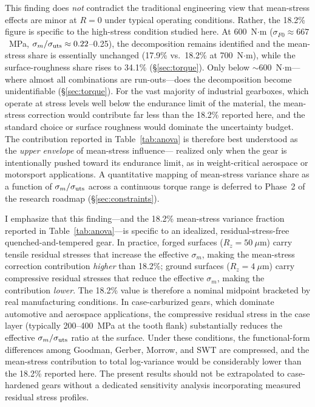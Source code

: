 \documentclass[twocolumn,12pt,a4paper]{article}
\begin{document}
This finding does \emph{not} contradict the traditional engineering
view that mean-stress effects are minor at $R=0$ under typical
operating conditions. Rather, the 18.2\% figure is specific to the
high-stress condition studied here. At 600~N$\cdot$m
($\sigma_{F0}\approx 667$~MPa, $\sigma_m/\sigma_{\rm uts}\approx
0.22$--0.25), the decomposition remains identified and the
mean-stress share is essentially unchanged (17.9\% vs.\ 18.2\% at
700~N$\cdot$m), while the surface-roughness share rises to 34.1\%
(\S\ref{sec:torque}). Only below $\sim$600~N$\cdot$m---where almost
all combinations are run-outs---does the decomposition become
unidentifiable (\S\ref{sec:torque}).
For the vast majority of industrial
gearboxes, which operate at stress levels well below the endurance
limit of the material, the mean-stress correction would contribute
far less than the 18.2\% reported here, and the standard choice or
surface roughness would dominate the uncertainty budget. The
contribution reported in Table~\ref{tab:anova} is therefore best
understood as the \emph{upper envelope} of mean-stress influence---
realized only when the gear is intentionally pushed toward its
endurance limit, as in weight-critical aerospace or motorsport
applications. A quantitative mapping of mean-stress variance share
as a function of $\sigma_m/\sigma_{\rm uts}$ across a continuous
torque range is deferred to Phase~2 of the research roadmap (\S\ref{sec:constraints}).

I emphasize that this finding---and the 18.2\% mean-stress variance
fraction reported in Table~\ref{tab:anova}---is specific to an
idealized, residual-stress-free quenched-and-tempered gear. In
practice, forged surfaces ($R_z=50~\mu$m) carry tensile residual
stresses that increase the effective $\sigma_m$, making the
mean-stress correction contribution \emph{higher} than 18.2\%;
ground surfaces ($R_z=4~\mu$m) carry compressive residual stresses
that reduce the effective $\sigma_m$, making the contribution
\emph{lower}. The 18.2\% value is therefore a nominal midpoint
bracketed by real manufacturing conditions. In
case-carburized gears, which dominate automotive and aerospace
applications, the compressive residual stress in the case layer
(typically 200--400~MPa at the tooth flank) substantially reduces the
effective $\sigma_m/\sigma_{\rm uts}$ ratio at the surface. Under these
conditions, the functional-form differences among Goodman, Gerber,
Morrow, and SWT are compressed, and the mean-stress contribution to
total log-variance would be considerably lower than the 18.2\% reported
here. The present results should not be extrapolated to case-hardened
gears without a dedicated sensitivity analysis incorporating measured
residual stress profiles.
\end{document}
